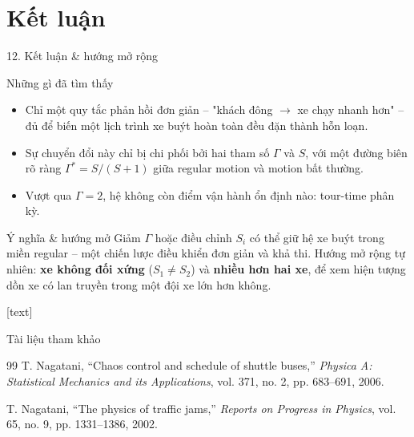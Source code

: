 \documentclass[t, aspectratio=169]{beamer}
\begin{document}
\section{Kết luận}

\begin{frame}{12. Kết luận \& hướng mở rộng}
	\begin{block}{Những gì đã tìm thấy}
		\begin{itemize}
			\item Chỉ một quy tắc phản hồi đơn giản -- "khách đông $\to$ xe chạy nhanh hơn" -- đủ để biến một lịch trình xe buýt hoàn toàn đều đặn thành hỗn loạn.
			\item Sự chuyển đổi này chỉ bị chi phối bởi hai tham số $\Gamma$ và $S$, với một đường biên rõ ràng $\Gamma^*=S/(S+1)$ giữa regular motion và motion bất thường.
			\item Vượt qua $\Gamma=2$, hệ không còn điểm vận hành ổn định nào: tour-time phân kỳ.
		\end{itemize}
	\end{block}

	\begin{alertblock}{Ý nghĩa \& hướng mở}
		Giảm $\Gamma$ hoặc điều chỉnh $S_i$ có thể giữ hệ xe buýt trong miền regular -- một chiến lược điều khiển đơn giản và khả thi. Hướng mở rộng tự nhiên: \textbf{xe không đối xứng} ($S_1 \neq S_2$) và \textbf{nhiều hơn hai xe}, để xem hiện tượng dồn xe có lan truyền trong một đội xe lớn hơn không.
	\end{alertblock}
\end{frame}

\useStyleLogoOnly
{}[text]

\begin{frame}[allowframebreaks]{Tài liệu tham khảo}
	\begin{thebibliography}{99}
		T. Nagatani,
		``Chaos control and schedule of shuttle buses,''
		\emph{Physica A: Statistical Mechanics and its Applications}, vol. 371, no. 2, pp. 683--691, 2006.

		T. Nagatani,
		``The physics of traffic jams,''
		\emph{Reports on Progress in Physics}, vol. 65, no. 9, pp. 1331--1386, 2002.
	\end{thebibliography}
\end{frame}

\end{document}
